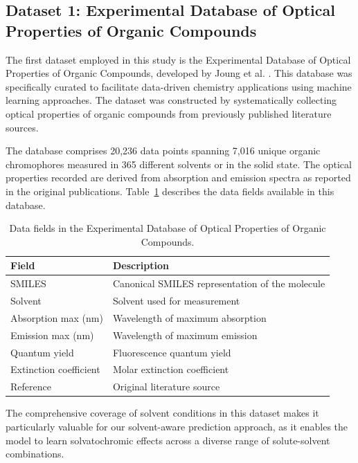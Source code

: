 \documentclass[11pt,a4paper]{article}
\begin{document}
\subsection{Dataset 1: Experimental Database of Optical Properties of Organic Compounds}

The first dataset employed in this study is the Experimental Database of Optical Properties of Organic Compounds, developed by Joung et al. \cite{joungExperimentalDatabaseOptical2020}. This database was specifically curated to facilitate data-driven chemistry applications using machine learning approaches. The dataset was constructed by systematically collecting optical properties of organic compounds from previously published literature sources.

The database comprises 20,236 data points spanning 7,016 unique organic chromophores measured in 365 different solvents or in the solid state. The optical properties recorded are derived from absorption and emission spectra as reported in the original publications. Table~\ref{tab:dataset1_format} describes the data fields available in this database.

\begin{table}[H]
\centering
\caption{Data fields in the Experimental Database of Optical Properties of Organic Compounds.}
\label{tab:dataset1_format}
\begin{tabular}{ll}
\toprule
\textbf{Field} & \textbf{Description} \\
\midrule
SMILES & Canonical SMILES representation of the molecule \\
Solvent & Solvent used for measurement \\
Absorption max (nm) & Wavelength of maximum absorption \\
Emission max (nm) & Wavelength of maximum emission \\
Quantum yield & Fluorescence quantum yield \\
Extinction coefficient & Molar extinction coefficient \\
Reference & Original literature source \\
\bottomrule
\end{tabular}
\end{table}

The comprehensive coverage of solvent conditions in this dataset makes it particularly valuable for our solvent-aware prediction approach, as it enables the model to learn solvatochromic effects across a diverse range of solute-solvent combinations.
\end{document}
